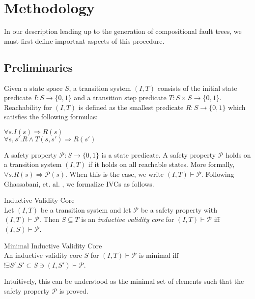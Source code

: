 \section{Methodology}
In our description leading up to the generation of compositional fault trees, we must first define important aspects of this procedure. 

\subsection{Preliminaries}
Given a state space $S$, a transition system $(I,T)$ consists of the initial state predicate $I : S \rightarrow \{0,1\}$ and a transition step predicate $T : S \times S \rightarrow \{0,1\}$. Reachability for $(I,T)$ is defined as the smallest predicate $R : S \rightarrow \{0,1\}$ which satisfies the following formulas:
\begin{center}
$\forall s. I(s) \Rightarrow R(s)$\\
$\forall s, s' .  R \land T(s,s') \Rightarrow R(s')$\\
\end{center}
A safety property $\mathcal{P} : S \to \{0,1\}$ is a state predicate. A safety property $\mathcal{P}$ holds on a transition system $(I,T)$ if it holds on all reachable states. More formally, $\forall s . R(s) \Rightarrow \mathcal{P}(s)$. When this is the case, we write $(I,T) \vdash\mathcal{P}$. Following Ghassabani, et. al. \cite{DBLP:journals/corr/GhassabaniGW16}, we formalize IVCs as follows.\\

\begin{definition}Inductive Validity Core\\
 Let $(I,T)$ be a transition system and let $\mathcal{P}$ be a safety property with $(I,T) \vdash \mathcal{P}$. Then $S \subseteq T$ is an \textit{inductive validity core} for $(I,T) \vdash \mathcal{P}$ iff $(I,S) \vdash\mathcal{P}$.  \\
\end{definition}

\begin{definition}Minimal Inductive Validity Core\\
An inductive validity core $S$ for $(I,T) \vdash \mathcal{P}$ is minimal iff $! \exists S' . S' \subset S \ni (I,S') \vdash \mathcal{P}$. \\
\end{definition}

Intuitively, this can be understood as the minimal set of elements such that the safety property $\mathcal{P}$ is proved. \\

